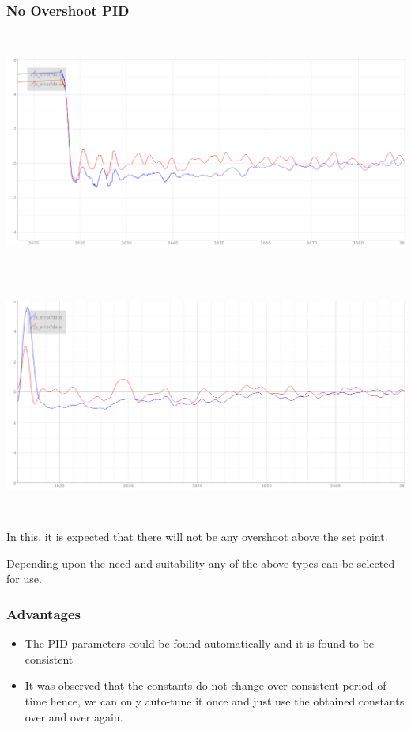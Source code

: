 \documentclass[a4paper,12pt,oneside]{book}
\begin{document}
 \subsubsection{No Overshoot PID}
\begin{flushleft}
\includegraphics[width = 15cm , height= 8cm]{No-overshoot-pid.png}
\includegraphics[width = 15cm , height= 8cm]{no-overshoot-pid2.png}
\end{flushleft}
In this, it is expected that there will not be any overshoot above the set point.
 
Depending upon the need and suitability any of the above types can be selected for use.

\subsubsection{Advantages}
\begin{itemize}
    \item The PID parameters could be found automatically and it is found to be consistent
    \item It was observed that the constants do not change over consistent period of time hence, we can only auto-tune it once and just use the obtained constants over and over again.
\end{itemize}
\end{document}
